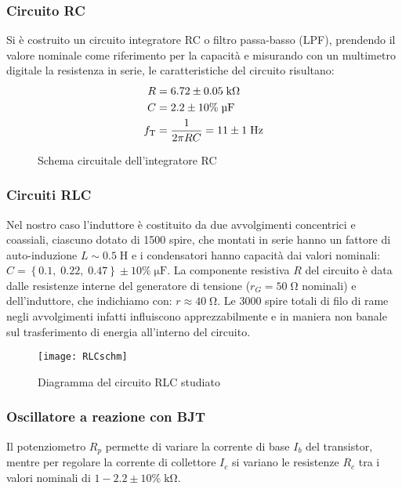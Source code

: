 \documentclass{article}[a4paper, oneside, 11pt]
\begin{document}
\subsubsection{Circuito RC}
Si è costruito un circuito integratore RC o filtro passa-basso (LPF),
prendendo il valore nominale come riferimento per la capacità e misurando
con un multimetro digitale la resistenza in serie, le caratteristiche del
circuito risultano:
\begin{align*}
R &= 6.72 \pm 0.05 \; \si{\kilo\ohm}\\
C &= 2.2 \pm 10\% \; \si{\micro\F}\\
f_{\rm T} &= \frac{1}{2 \pi R C} = 11 \pm 1 \; \si{\hertz}
\end{align*}
\begin{figure}[!htb]
	\centering
	
	\caption{Schema circuitale dell'integratore RC \label{fig: RC}}
\end{figure}
\subsubsection{Circuiti RLC}
Nel nostro caso l'induttore è costituito da due avvolgimenti concentrici
e coassiali, ciascuno dotato di 1500 spire, che montati in serie hanno un
fattore di auto-induzione $L \sim 0.5 \; \si{\henry}$ e i condensatori hanno
capacità dai valori nominali: $C = \left\{0.1,\; 0.22,\; 0.47\right\} \pm
10\% \; \si{\micro\farad}$. La componente resistiva $R$ del circuito è data
dalle resistenze interne del generatore di tensione ($r_G = 50 \; \si{\ohm}$
nominali) e dell'induttore, che indichiamo con: $r \approx 40 \;\si{\ohm}$.
Le $3000$ spire totali di filo di rame negli avvolgimenti infatti
influiscono apprezzabilmente e in maniera non banale sul trasferimento
di energia all'interno del circuito.

\begin{figure}[!htp]
	\centering 
		\texttt{[image: RLCschm]}
	\caption{Diagramma del circuito RLC studiato\label{schm: RLC}}
\end{figure}

\subsubsection{Oscillatore a reazione con BJT}
Il potenziometro $R_p$ permette di variare la corrente di base $I_b$ 
del transistor, mentre per regolare la corrente di collettore $I_c$ si variano
le resistenze $R_c$ tra i valori nominali di $1 - 2.2 \pm 10 \% \; 
\si{\kilo\ohm}$. 
\end{document}
